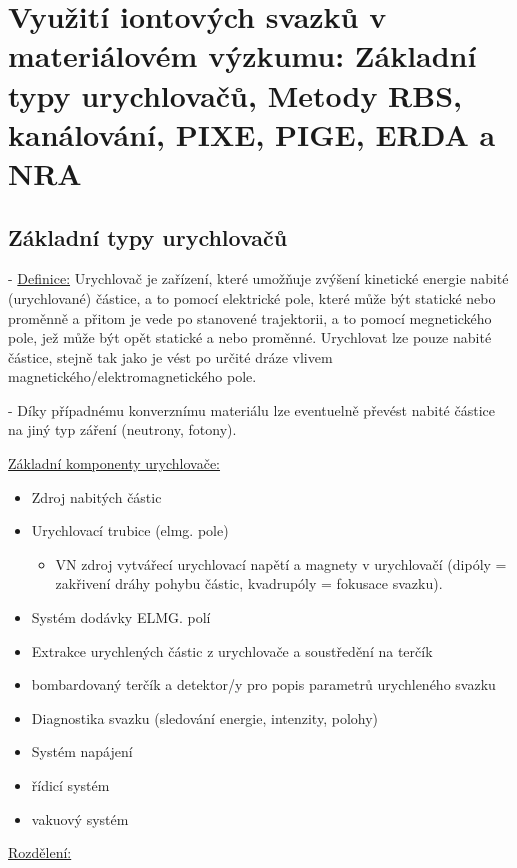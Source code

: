 \section{Využití iontových svazků v materiálovém výzkumu: Základní typy urychlovačů, Metody RBS, kanálování, PIXE, PIGE, ERDA a NRA}

\subsection{Základní typy urychlovačů}

- \underline{Definice:} Urychlovač je zařízení, které umožňuje zvýšení kinetické energie nabité (urychlované) částice, a to pomocí elektrické pole, které může být statické nebo proměnně a přitom je vede po stanovené trajektorii, a to pomocí megnetického pole, jež může být opět statické a nebo proměnné. Urychlovat lze pouze nabité částice, stejně tak jako je vést po určité dráze vlivem magnetického/elektromagnetického pole.

- Díky případnému konverznímu materiálu lze eventuelně převést nabité částice na jiný typ záření (neutrony, fotony).

\underline{Základní komponenty urychlovače:}

\begin{itemize}
    \item Zdroj nabitých částic
    \item Urychlovací trubice (elmg. pole)
    \begin{itemize}
        \item VN zdroj vytvářecí urychlovací napětí a magnety v urychlovačí (dipóly = zakřivení dráhy pohybu částic, kvadrupóly = fokusace svazku).
    \end{itemize}
    \item Systém dodávky ELMG. polí
    \item Extrakce urychlených částic z urychlovače a soustředění na terčík
    \item bombardovaný terčík a detektor/y pro popis parametrů urychleného svazku
    \item Diagnostika svazku (sledování energie, intenzity, polohy)
    \item Systém napájení
    \item řídicí systém
    \item vakuový systém

\end{itemize}

\underline{Rozdělení:}

